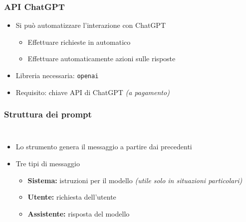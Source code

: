 
\begin{contentframe}
    \frametitle{API ChatGPT}

    \begin{itemize}
        \item Si può automatizzare l'interazione con ChatGPT
        \begin{itemize}
            \item Effettuare richieste in automatico
            \item Effettuare automaticamente azioni sulle risposte
        \end{itemize}

        \bigskip
        \item Libreria necessaria: \texttt{openai} 
        \item Requisito: chiave API di ChatGPT \textit{(a pagamento)}
    \end{itemize}
\end{contentframe}

\begin{contentframe}
    \frametitle{Struttura dei prompt}

    \begin{columns}
        \begin{itemize}
            \item Lo strumento genera il messaggio a partire dai precedenti
    
            \bigskip
            \item Tre tipi di messaggio
            \begin{itemize}
                \item \textbf{Sistema:} istruzioni per il modello \textit{(utile solo in situazioni particolari)}
                \item \textbf{Utente:} richiesta dell'utente
                \item \textbf{Assistente:} risposta del modello
            \end{itemize}
        \end{itemize}

        \centering
    \end{columns}
\end{contentframe}

